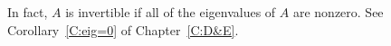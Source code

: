 \documentclass{ximera}
\begin{document}
  In fact, $A$ is invertible if 
all of the eigenvalues of $A$ are nonzero.  See Corollary~\ref{C:eig=0} of 
Chapter~\ref{C:D&E}.


\CEXER
\end{document}
